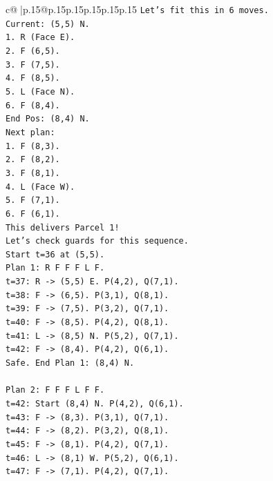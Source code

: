 \documentclass{article}
\begin{document}
{\begin{supertabular}{c@{$\;$}|p{.15\linewidth}@{}p{.15\linewidth}p{.15\linewidth}p{.15\linewidth}p{.15\linewidth}p{.15\linewidth}}
{{{\texttt{Let's fit this in 6 moves.} \\
\texttt{Current: (5,5) N.} \\
\texttt{1. R (Face E).} \\
\texttt{2. F (6,5).} \\
\texttt{3. F (7,5).} \\
\texttt{4. F (8,5).} \\
\texttt{5. L (Face N).} \\
\texttt{6. F (8,4).} \\
\texttt{End Pos: (8,4) N.} \\
\texttt{Next plan:} \\
\texttt{1. F (8,3).} \\
\texttt{2. F (8,2).} \\
\texttt{3. F (8,1).} \\
\texttt{4. L (Face W).} \\
\texttt{5. F (7,1).} \\
\texttt{6. F (6,1).} \\
\texttt{This delivers Parcel 1!} \\
\texttt{Let's check guards for this sequence.} \\
\texttt{Start t=36 at (5,5).} \\
\texttt{Plan 1: R F F F L F.} \\
\texttt{t=37: R {-}> (5,5) E. P(4,2), Q(7,1).} \\
\texttt{t=38: F {-}> (6,5). P(3,1), Q(8,1).} \\
\texttt{t=39: F {-}> (7,5). P(3,2), Q(7,1).} \\
\texttt{t=40: F {-}> (8,5). P(4,2), Q(8,1).} \\
\texttt{t=41: L {-}> (8,5) N. P(5,2), Q(7,1).} \\
\texttt{t=42: F {-}> (8,4). P(4,2), Q(6,1).} \\
\texttt{Safe. End Plan 1: (8,4) N.} \\
\\ 
\texttt{Plan 2: F F F L F F.} \\
\texttt{t=42: Start (8,4) N. P(4,2), Q(6,1).} \\
\texttt{t=43: F {-}> (8,3). P(3,1), Q(7,1).} \\
\texttt{t=44: F {-}> (8,2). P(3,2), Q(8,1).} \\
\texttt{t=45: F {-}> (8,1). P(4,2), Q(7,1).} \\
\texttt{t=46: L {-}> (8,1) W. P(5,2), Q(6,1).} \\
\texttt{t=47: F {-}> (7,1). P(4,2), Q(7,1).} \\
}}}
\end{supertabular}}
\end{document}
